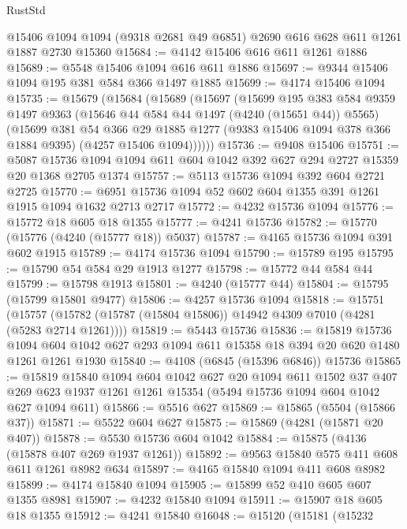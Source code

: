 \begin{lexlean}{RustStd}
\begin{coremodule}
{\begin{coremodule}
{{{{{{{{{{{{{{{{{{{{{{{{{{{{{{{{{{{    @15406
    @1094
    @1094
    (@9318 @2681 @49 @6851)
    @2690
    @616
    @628
    @611
    @1261
    @1887
    @2730
    @15360
@15684 := @4142 @15406 @616 @611 @1261 @1886
@15689 := @5548 @15406 @1094 @616 @611 @1886
@15697 := @9344 @15406 @1094 @195 @381 @584 @366 @1497 @1885
@15699 := @4174 @15406 @1094
@15735 := @15679
    (@15684
      (@15689
        (@15697
          (@15699
            @195
            @383
            @584
            @9359
            @1497
            @9363
            (@15646 @44 @584 @44 @1497 (@4240 (@15651 @44)) @5565)
            (@15699
              @381
              @54
              @366
              @29
              @1885
              @1277
              (@9383 @15406 @1094 @378 @366 @1884 @9395)
              (@4257 @15406 @1094))))))
@15736 := @9408 @15406
@15751 := @5087 @15736 @1094 @1094 @611 @604 @1042 @392 @627 @294 @2727 @15359 @20 @1368 @2705 @1374
@15757 := @5113 @15736 @1094 @392 @604 @2721 @2725
@15770 := @6951 @15736 @1094 @52 @602 @604 @1355 @391 @1261 @1915 @1094 @1632 @2713 @2717
@15772 := @4232 @15736 @1094
@15776 := @15772 @18 @605 @18 @1355
@15777 := @4241 @15736
@15782 := @15770 (@15776 (@4240 (@15777 @18)) @5037)
@15787 := @4165 @15736 @1094 @391 @602 @1915
@15789 := @4174 @15736 @1094
@15790 := @15789 @195
@15795 := @15790 @54 @584 @29 @1913 @1277
@15798 := @15772 @44 @584 @44
@15799 := @15798 @1913
@15801 := @4240 (@15777 @44)
@15804 := @15795 (@15799 @15801 @9477)
@15806 := @4257 @15736 @1094
@15818 := @15751
    (@15757 (@15782 (@15787 (@15804 @15806)) @14942 @4309 @7010 (@4281 (@5283 @2714 @1261))))
@15819 := @5443 @15736
@15836 := @15819
    @15736
    @1094
    @604
    @1042
    @627
    @293
    @1094
    @611
    @15358
    @18
    @394
    @20
    @620
    @1480
    @1261
    @1261
    @1930
@15840 := @4108 (@6845 (@15396 @6846)) @15736
@15865 := @15819
    @15840
    @1094
    @604
    @1042
    @627
    @20
    @1094
    @611
    @1502
    @37
    @407
    @269
    @623
    @1937
    @1261
    @1261
    @15354
    (@5494 @15736 @1094 @604 @1042 @627 @1094 @611)
@15866 := @5516 @627
@15869 := @15865 (@5504 (@15866 @37))
@15871 := @5522 @604 @627
@15875 := @15869 (@4281 (@15871 @20 @407))
@15878 := @5530 @15736 @604 @1042
@15884 := @15875 (@4136 (@15878 @407 @269 @1937 @1261))
@15892 := @9563 @15840 @575 @411 @608 @611 @1261 @8982 @634
@15897 := @4165 @15840 @1094 @411 @608 @8982
@15899 := @4174 @15840 @1094
@15905 := @15899 @52 @410 @605 @607 @1355 @8981
@15907 := @4232 @15840 @1094
@15911 := @15907 @18 @605 @18 @1355
@15912 := @4241 @15840
@16048 := @15120
    (@15181
      (@15232
}}}}}}}}}}}}}}}}}}}}}}}}}}}}}}}}}}}
\end{coremodule}}
\end{coremodule}
\end{lexlean}
